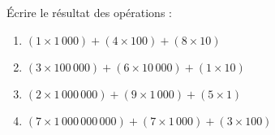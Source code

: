 \begin{exercice}{}{}
    Écrire le résultat des opérations :
     \begin{enumerate}
        \item $(1\times1\,000) + (4\times100) + (8\times10)$
        \item $(3\times100\,000) + (6\times10\,000) + (1\times10)$
        \item $(2\times1\,000\,000) + (9\times1\,000) + (5\times1)$
        \item $(7\times1\,000\,000\,000) + (7\times1\,000) + (3\times100)$
     \end{enumerate}
\end{exercice}